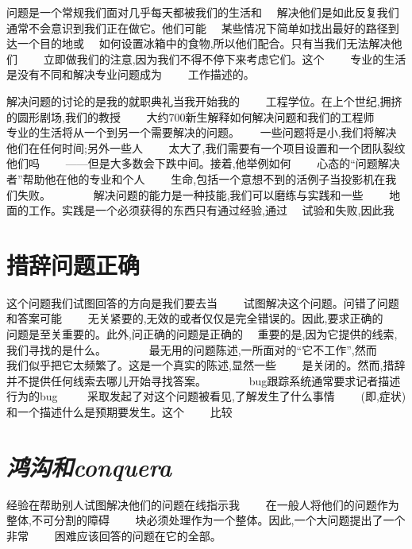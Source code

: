 

\noindent{}问题是一个常规我们面对几乎每天都被我们的生活和　
解决他们是如此反复我们通常不会意识到我们正在做它。他们可能　
某些情况下简单如找出最好的路径到达一个目的地或　
如何设置冰箱中的食物,所以他们配合。只有当我们无法解决他们　　
立即做我们的注意,因为我们不得不停下来考虑它们。这个　　
专业的生活是没有不同和解决专业问题成为　　
工作描述的。

解决问题的讨论的是我的就职典礼当我开始我的　　
工程学位。在上个世纪,拥挤的圆形剧场,我们的教授　　
大约700新生解释如何解决问题和我们的工程师　　
专业的生活将从一个到另一个需要解决的问题。　　
一些问题将是小,我们将解决他们在任何时间;另外一些人　　
太大了,我们需要有一个项目设置和一个团队裂纹他们吗　　
——但是大多数会下跌中间。接着,他举例如何　　
心态的“问题解决者”帮助他在他的专业和个人　　
生命,包括一个意想不到的活例子当投影机在我们失败。　　　　
解决问题的能力是一种技能,我们可以磨练与实践和一些　　
地面的工作。实践是一个必须获得的东西只有通过经验,通过　
试验和失败,因此我
\section*{措辞问题正确}

这个问题我们试图回答的方向是我们要去当　　
试图解决这个问题。问错了问题和答案可能　　
无关紧要的,无效的或者仅仅是完全错误的。因此,要求正确的　　
问题是至关重要的。此外,问正确的问题是正确的　
重要的是,因为它提供的线索,我们寻找的是什么。　　　　
最无用的问题陈述,一所面对的“它不工作”,然而　　
我们似乎把它太频繁了。这是一个真实的陈述,显然一些　　
是关闭的。然而,措辞并不提供任何线索去哪儿开始寻找答案。　　　　
bug跟踪系统通常要求记者描述行为的bug 　　
采取发起了对这个问题被看见,了解发生了什么事情　　
(即,症状)和一个描述什么是预期要发生。这个　　
比较

\section*{\textit{鸿沟和conquera}}

经验在帮助别人试图解决他们的问题在线指示我　　
在一般人将他们的问题作为整体,不可分割的障碍　　
块必须处理作为一个整体。因此,一个大问题提出了一个非常　　
困难应该回答的问题在它的全部。

